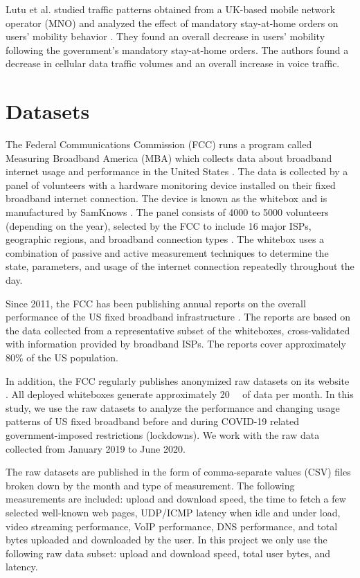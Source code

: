 \documentclass[conference,10pt]{IEEEtran}
\begin{document}
Lutu et al. studied traffic patterns obtained from a UK-based mobile network operator (MNO) and analyzed the effect of mandatory stay-at-home orders on users' mobility behavior \cite{lutu2020mobile}. They found an overall decrease in users' mobility following the government’s mandatory stay-at-home orders. The authors found a decrease in cellular data traffic volumes and an overall increase in voice traffic.

\section{Datasets}
\label{sec:datasets}

The Federal Communications Commission (FCC) runs a program called Measuring Broadband America (MBA) which collects data about broadband internet usage and performance in the United States \cite{mba}. The data is collected by a panel of volunteers with a hardware monitoring device installed on their fixed broadband internet connection. The device is known as the whitebox and is manufactured by SamKnows \cite{sam}. The panel consists of 4000 to 5000 volunteers (depending on the year), selected by the FCC to include 16 major ISPs, geographic regions, and broadband connection types \cite{fcc-report-appendix}. The whitebox uses a combination of passive and active measurement techniques to determine the state, parameters, and usage of the internet connection repeatedly throughout the day.

Since 2011, the FCC has been publishing annual reports on the overall performance of the US fixed broadband infrastructure \cite{mba-studies}. The reports are based on the data collected from a representative subset of the whiteboxes, cross-validated with information provided by broadband ISPs. The reports cover approximately 80\% of the US population.

In addition, the FCC regularly publishes anonymized raw datasets on its website \cite{data}. All deployed whiteboxes generate approximately \SI{20}{\giga\byte} of data per month. In this study, we use the raw datasets to analyze the performance and changing usage patterns of US fixed broadband before and during COVID-19 related government-imposed restrictions (lockdowns). We work with the raw data collected from January 2019 to June 2020.

The raw datasets are published in the form of comma-separate values (CSV) files broken down by the month and type of measurement. The following measurements are included: upload and download speed, the time to fetch a few selected well-known web pages, UDP/ICMP latency when idle and under load, video streaming performance, VoIP performance, DNS performance, and total bytes uploaded and downloaded by the user. In this project we only use the following raw data subset: upload and download speed, total user bytes, and latency.
\end{document}
